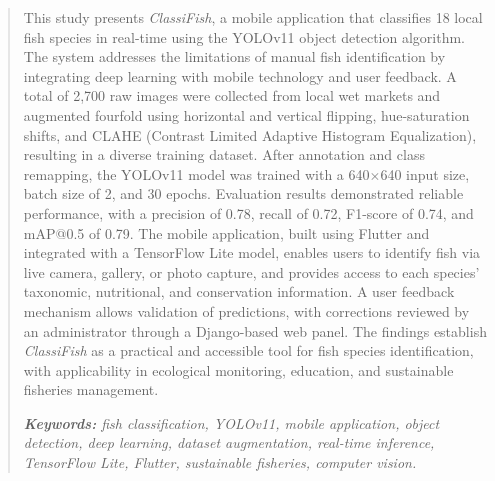 
\begin{abstract}
This study presents \textit{ClassiFish}, a mobile application that classifies 18 local fish species in real-time using the YOLOv11 object detection algorithm. The system addresses the limitations of manual fish identification by integrating deep learning with mobile technology and user feedback. A total of 2,700 raw images were collected from local wet markets and augmented fourfold using horizontal and vertical flipping, hue-saturation shifts, and CLAHE (Contrast Limited Adaptive Histogram Equalization), resulting in a diverse training dataset. After annotation and class remapping, the YOLOv11 model was trained with a 640$\times$640 input size, batch size of 2, and 30 epochs. Evaluation results demonstrated reliable performance, with a precision of 0.78, recall of 0.72, F1-score of 0.74, and mAP@0.5 of 0.79. The mobile application, built using Flutter and integrated with a TensorFlow Lite model, enables users to identify fish via live camera, gallery, or photo capture, and provides access to each species’ taxonomic, nutritional, and conservation information. A user feedback mechanism allows validation of predictions, with corrections reviewed by an administrator through a Django-based web panel. The findings establish \textit{ClassiFish} as a practical and accessible tool for fish species identification, with applicability in ecological monitoring, education, and sustainable fisheries management.

\textit{\textbf{Keywords:} fish classification, YOLOv11, mobile application, object detection, deep learning, dataset augmentation, real-time inference, TensorFlow Lite, Flutter, sustainable fisheries, computer vision.}
\end{abstract}
